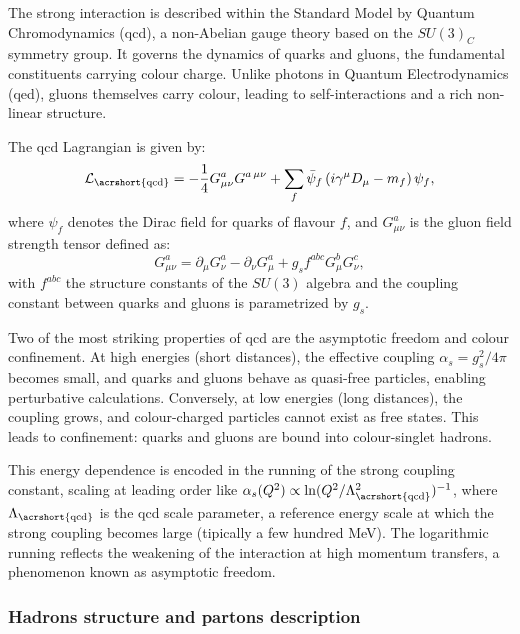 The strong interaction is described within the Standard Model by Quantum Chromodynamics (\acrshort{qcd}), a non-Abelian gauge theory based on the \(SU(3)_C\) symmetry group. It governs the dynamics of quarks and gluons, the fundamental constituents carrying colour charge. Unlike photons in Quantum Electrodynamics (\acrshort{qed}), gluons themselves carry colour, leading to self-interactions and a rich non-linear structure.

The \acrshort{qcd} Lagrangian is given by:
\begin{equation}
\mathcal{L}_{\mathrm{\acrshort{qcd}}} = -\frac{1}{4} G^{a}_{\mu\nu} G^{a\,\mu\nu} + \sum_{f} \bar{\psi}_f \left( i \gamma^\mu D_\mu - m_f \right) \psi_f,
\end{equation}
where \(\psi_f\) denotes the Dirac field for quarks of flavour \(f\), and \(G^a_{\mu\nu}\) is the gluon field strength tensor defined as:
\begin{equation}
G^a_{\mu\nu} = \partial_\mu G^a_\nu - \partial_\nu G^a_\mu + g_s f^{abc} G^b_\mu G^c_\nu,
\end{equation}
with \(f^{abc}\) the structure constants of the \(SU(3)\) algebra and the coupling constant between quarks and gluons is parametrized by \(g_s\).

Two of the most striking properties of \acrshort{qcd} are the asymptotic freedom and colour confinement. At high energies (short distances), the effective coupling \(\alpha_s = g_s^2 / 4\pi\) becomes small, and quarks and gluons behave as quasi-free particles, enabling perturbative calculations. Conversely, at low energies (long distances), the coupling grows, and colour-charged particles cannot exist as free states. This leads to confinement: quarks and gluons are bound into colour-singlet hadrons.

This energy dependence is encoded in the running of the strong coupling constant, scaling at leading order like $\alpha_s(Q^2) \propto\ln(Q^2/\Lambda_{\mathrm{\acrshort{qcd}}}^2)^{-1}$, where \(\Lambda_{\mathrm{\acrshort{qcd}}}\) is the \acrshort{qcd} scale parameter, a reference energy scale at which the strong coupling becomes large (tipically a few hundred MeV). The logarithmic running reflects the weakening of the interaction at high momentum transfers, a phenomenon known as asymptotic freedom.

\subsubsection*{Hadrons structure and partons description}
\label{subsec:proton}

